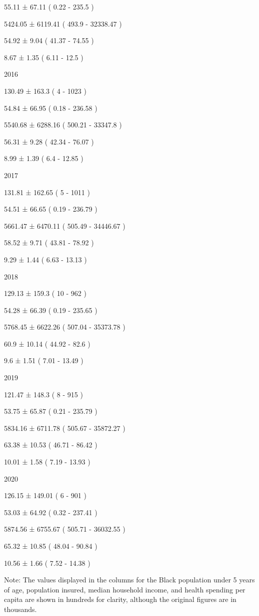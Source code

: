 \documentclass[
]{article}
\begin{document}
55.11 ± 67.11 ( 0.22 - 235.5 )

5424.05 ± 6119.41 ( 493.9 - 32338.47 )

54.92 ± 9.04 ( 41.37 - 74.55 )

8.67 ± 1.35 ( 6.11 - 12.5 )

2016

130.49 ± 163.3 ( 4 - 1023 )

54.84 ± 66.95 ( 0.18 - 236.58 )

5540.68 ± 6288.16 ( 500.21 - 33347.8 )

56.31 ± 9.28 ( 42.34 - 76.07 )

8.99 ± 1.39 ( 6.4 - 12.85 )

2017

131.81 ± 162.65 ( 5 - 1011 )

54.51 ± 66.65 ( 0.19 - 236.79 )

5661.47 ± 6470.11 ( 505.49 - 34446.67 )

58.52 ± 9.71 ( 43.81 - 78.92 )

9.29 ± 1.44 ( 6.63 - 13.13 )

2018

129.13 ± 159.3 ( 10 - 962 )

54.28 ± 66.39 ( 0.19 - 235.65 )

5768.45 ± 6622.26 ( 507.04 - 35373.78 )

60.9 ± 10.14 ( 44.92 - 82.6 )

9.6 ± 1.51 ( 7.01 - 13.49 )

2019

121.47 ± 148.3 ( 8 - 915 )

53.75 ± 65.87 ( 0.21 - 235.79 )

5834.16 ± 6711.78 ( 505.67 - 35872.27 )

63.38 ± 10.53 ( 46.71 - 86.42 )

10.01 ± 1.58 ( 7.19 - 13.93 )

2020

126.15 ± 149.01 ( 6 - 901 )

53.03 ± 64.92 ( 0.32 - 237.41 )

5874.56 ± 6755.67 ( 505.71 - 36032.55 )

65.32 ± 10.85 ( 48.04 - 90.84 )

10.56 ± 1.66 ( 7.52 - 14.38 )

Note: The values displayed in the columns for the Black population under
5 years of age, population insured, median household income, and health
spending per capita are shown in hundreds for clarity, although the
original figures are in thousands.
\end{document}
